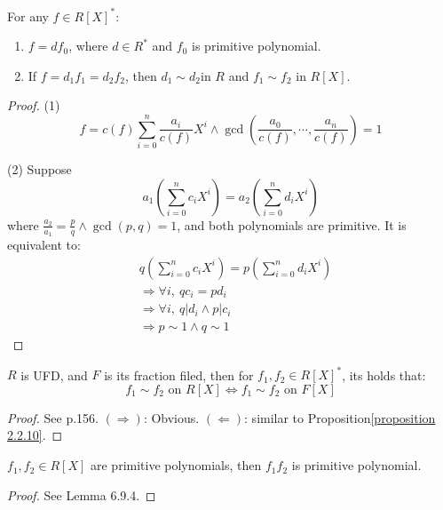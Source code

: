 \begin{proposition}
    \label{proposition 2.2.10}
    For any $f \in R[X]^*$:
    \begin{enumerate}
        \item $f = df_0$, where $d \in R^*$ and $f_0$ is primitive polynomial.
        \item If $f = d_1 f_1 = d_2 f_2$, then $d_1 \sim d_2 $in $R$ and $f_1 \sim f_2 $ in $R[X]$.
    \end{enumerate}
\end{proposition}
\begin{proof}
    (1)
    \[
        f = c(f) \sum_{i=0}^n \frac{a_i}{c(f)} X^i \land \gcd\left( \frac{a_0}{c(f)}, \cdots, \frac{a_n}{c(f)} \right) = 1
    \]

    (2)
    Suppose
    \[
        a_1\left( \sum_{i=0}^{n} c_i X^i \right) = a_2\left( \sum_{i=0}^{n} d_i X^i \right)
    \]
    where $\frac{a_2}{a_1}  = \frac{p}{q} \land \gcd(p, q) = 1$, and both polynomials are primitive. It is equivalent to:
    \begin{align*}
        & q \left( \sum_{i=0}^{n} c_i X^i \right) =  p \left( \sum_{i=0}^{n} d_i X^i \right) \\
        & \Rightarrow \forall i ,\ q c_i = p d_i \\
        & \Rightarrow \forall i,\ q | d_i \land p | c_i \\
        & \Rightarrow p\sim 1 \land q \sim 1
    \end{align*}
\end{proof}


\begin{proposition}
    $R$ is UFD, and $F$ is its fraction filed, then for $f_1, f_2 \in R[X]^*$, its holds that:
    \[
        f_1 \sim f_2 \text{ on } R[X] \Leftrightarrow  f_1 \sim f_2 \text{ on } F[X]
    \]
\end{proposition}
\begin{proof}
    See \cite{Qiu_MA} p.156. $(\Rightarrow)$: Obvious. $(\Leftarrow)$: similar to Proposition\ref{proposition 2.2.10}.
\end{proof}





\begin{lemma}
    $f_1, f_2 \in R[X]$ are primitive polynomials, then $f_1f_2$ is primitive polynomial.
\end{lemma}
\begin{proof}
    See \cite{LWW_AJN} Lemma 6.9.4.
\end{proof}









